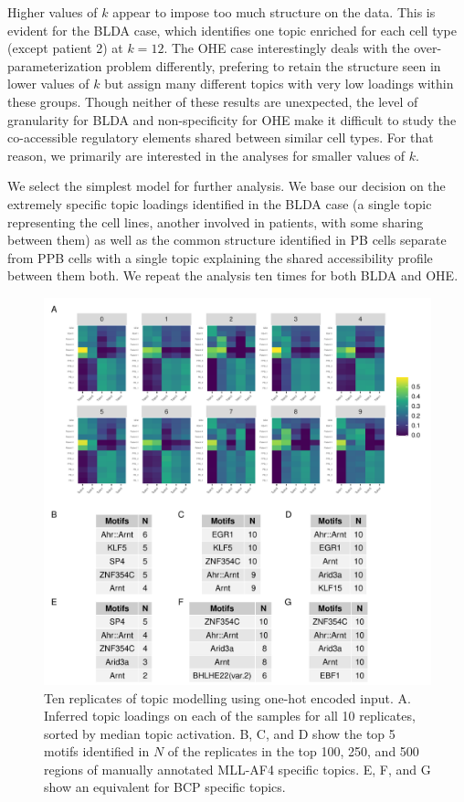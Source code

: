 Higher values of $k$ appear to impose too much structure on the data. This is evident for the BLDA case, which identifies one topic enriched for each cell type (except patient 2) at $k=12$. The OHE case interestingly deals with the over-parameterization problem differently, prefering to retain the structure seen in lower values of $k$ but assign many different topics with very low loadings within these groups. Though neither of these results are unexpected, the level of granularity for BLDA and non-specificity for OHE make it difficult to study the co-accessible regulatory elements shared between similar cell types. For that reason, we primarily are interested in the analyses for smaller values of $k$.

We select the simplest model for further analysis. We base our decision on the extremely specific topic loadings identified in the BLDA case (a single topic representing the cell lines, another involved in patients, with some sharing between them) as well as the common structure identified in PB cells separate from PPB cells with a single topic explaining the shared accessibility profile between them both. We repeat the analysis ten times for both BLDA and OHE. 

\begin{figure}
    \centering
    \includegraphics[width=\textwidth]{plot/ch5/mll_redo_dummy_reps.pdf}
    \caption{Ten replicates of topic modelling using one-hot encoded input. A. Inferred topic loadings on each of the samples for all 10 replicates, sorted by median topic activation. B, C, and D show the top 5 motifs identified in $N$ of the replicates in the top 100, 250, and 500 regions of manually annotated MLL-AF4 specific topics. E, F, and G show an equivalent for BCP specific topics.}
    \label{fig:mll_redo_topics}
\end{figure}


